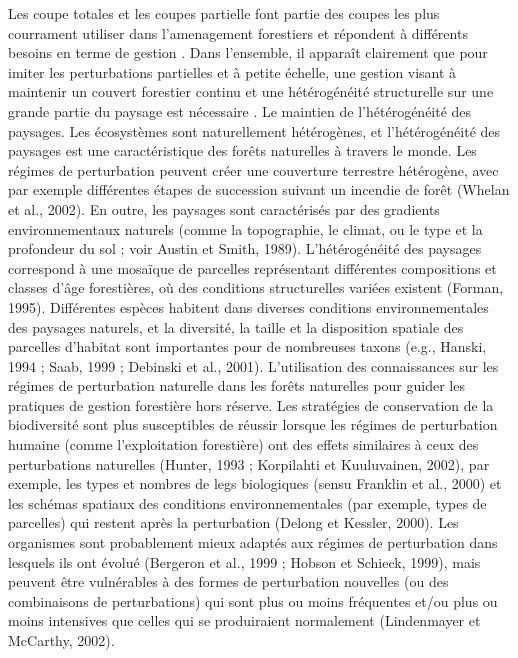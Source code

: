 Les coupe totales et les coupes partielle font partie des coupes les plus courrament utiliser dans l'amenagement forestiers et répondent  à différents besoins en terme de gestion \citep{Man2008Elevenyearresponses,Chaudhary2016Impactforest,MontoroGirona2018ConiferRegeneration,Ameray2021Forestcarbon}.
Dans l'ensemble, il apparaît clairement que pour imiter les perturbations partielles et à petite échelle, une gestion visant à maintenir un couvert forestier continu et une hétérogénéité structurelle sur une grande partie du paysage est nécessaire \citep{Kuuluvainen2009Forestmanagement}.  
Le maintien de l'hétérogénéité des paysages.
Les écosystèmes sont naturellement hétérogènes, et l'hétérogénéité des paysages est une caractéristique des forêts naturelles à travers le monde. 
Les régimes de perturbation peuvent créer une couverture terrestre hétérogène, avec par exemple différentes étapes de succession suivant un incendie de forêt (Whelan et al., 2002). 
En outre, les paysages sont caractérisés par des gradients environnementaux naturels (comme la topographie, le climat, ou le type et la profondeur du sol ; voir Austin et Smith, 1989). 
L'hétérogénéité des paysages correspond à une mosaïque de parcelles représentant différentes compositions et classes d'âge forestières, où des conditions structurelles variées existent (Forman, 1995). 
Différentes espèces habitent dans diverses conditions environnementales des paysages naturels, et la diversité, la taille et la disposition spatiale des parcelles d'habitat sont importantes pour de nombreuses taxons (e.g., Hanski, 1994 ; Saab, 1999 ; Debinski et al., 2001).
L'utilisation des connaissances sur les régimes de perturbation naturelle dans les forêts naturelles pour guider les pratiques de gestion forestière hors réserve. 
Les stratégies de conservation de la biodiversité sont plus susceptibles de réussir lorsque les régimes de perturbation humaine (comme l'exploitation forestière) ont des effets similaires à ceux des perturbations naturelles (Hunter, 1993 ; Korpilahti et Kuuluvainen, 2002), par exemple, les types et nombres de legs biologiques (sensu Franklin et al., 2000) et les schémas spatiaux des conditions environnementales (par exemple, types de parcelles) qui restent après la perturbation (Delong et Kessler, 2000). 
Les organismes sont probablement mieux adaptés aux régimes de perturbation dans lesquels ils ont évolué (Bergeron et al., 1999 ; Hobson et Schieck, 1999), mais peuvent être vulnérables à des formes de perturbation nouvelles (ou des combinaisons de perturbations) qui sont plus ou moins fréquentes et/ou plus ou moins intensives que celles qui se produiraient normalement (Lindenmayer et McCarthy, 2002). 
